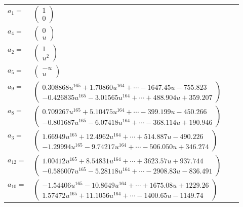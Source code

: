 \documentclass[1p]{elsarticle_modified}
\theoremstyle{definition}
\begin{document}
\begin{tabular}{m{7pt} m{180pt} m{7pt} m{180pt} }
\flushright $a_{1}=$&$\begin{pmatrix}1\\0\end{pmatrix}$ \\
\flushright $a_{4}=$&$\begin{pmatrix}0\\u\end{pmatrix}$ \\
\flushright $a_{2}=$&$\begin{pmatrix}1\\u^2\end{pmatrix}$ \\
\flushright $a_{5}=$&$\begin{pmatrix}- u\\u\end{pmatrix}$ \\
\flushright $a_{9}=$&$\begin{pmatrix}0.308868 u^{165}+1.70860 u^{164}+\cdots-1647.45 u-755.823\\-0.426835 u^{165}-3.01565 u^{164}+\cdots+488.904 u+359.207\end{pmatrix}$ \\
\flushright $a_{8}=$&$\begin{pmatrix}0.709267 u^{165}+5.10475 u^{164}+\cdots-399.199 u-450.266\\-0.801687 u^{165}-6.07418 u^{164}+\cdots-368.114 u+190.946\end{pmatrix}$ \\
\flushright $a_{3}=$&$\begin{pmatrix}1.66949 u^{165}+12.4962 u^{164}+\cdots+514.887 u-490.226\\-1.29994 u^{165}-9.74217 u^{164}+\cdots-506.050 u+346.274\end{pmatrix}$ \\
\flushright $a_{12}=$&$\begin{pmatrix}1.00412 u^{165}+8.54831 u^{164}+\cdots+3623.57 u+937.744\\-0.586007 u^{165}-5.28118 u^{164}+\cdots-2908.83 u-836.491\end{pmatrix}$ \\
\flushright $a_{10}=$&$\begin{pmatrix}-1.54406 u^{165}-10.8649 u^{164}+\cdots+1675.08 u+1229.26\\1.57472 u^{165}+11.1056 u^{164}+\cdots-1400.65 u-1149.74\end{pmatrix}$ \\

\end{tabular}
\end{document}
